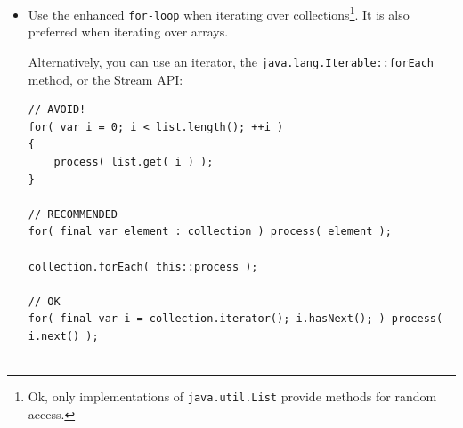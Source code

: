 \documentclass[11pt,a4paper, titlepage, parskip=half, headsepline, footsepline, cleardoublepage=current, headheight=1cm]{scrbook}
\newcommand*{\tqvref}[1]{\hyperref[{#1}]{\ref*{#1}} on page~\pageref{#1}}
\begin{document}
\begin{itemize}
{For method arguments and return values, you should use the interfaces \lstinline|java.util.List|\autocite{ORACLE_DOC_LIST_INTERFACE} instead of \lstinline|Vector|, and \lstinline|java.util.Map|\autocite{ORACLE_DOC_MAP_INTERFACE} instead of \lstinline|Hashtable|. Refer also to chapter \tqvref{sec:TypeOfArgumentsAndReturnValues} that elaborates further on this topic.

If you need an implementation of the \lstinline|List| interface, you should prefer \lstinline|java.util.ArrayList|\autocite{ORACLE_DOC_ARRAYLIST_CLASS} over \lstinline|java.util.LinkedList|\autocite{ORACLE_DOC_LINKEDLIST_CLASS}. The latter is only more performant in some very rare cases, and it also has a bigger memory footprint\footnote{Internally, an \lstinline|ArrayList| uses an array for the entries, and when this gets too small, a new array with twice the size will be allocated. This means that for some time two large array will exist. For really, really large lists, this may cause an issue. In the opposite, a \lstinline|LinkedList| will grow entry by entry.}.

Instead of \lstinline|Hashtable|, you should use \lstinline|java.util.HashMap|\autocite{ORACLE_DOC_HASHMAP_CLASS} as the implementation for the \lstinline|Map| interface.

If you really need a synchronised list, you can still consider to use \lstinline|Vector| as your implementation of \lstinline|List|, but for a syncronised implementation of \lstinline|Map|, you should take \lstinline|java.util.concurrent.ConcurrentHashMap|\autocite{ORACLE_DOC_CONCURRENTHASHMAP_CLASS}.}

\item{Use the enhanced \lstinline|for-loop| when iterating over collections\footnote{Ok, only implementations of \lstinline|java.util.List|\autocite{ORACLE_DOC_LIST_INTERFACE} provide methods for random access.}. It is also preferred when iterating over arrays.

Alternatively, you can use an iterator, the \lstinline|java.lang.Iterable::forEach| method, or the Stream API:
\begin{lstlisting}
// AVOID!
for( var i = 0; i < list.length(); ++i )
{
    process( list.get( i ) );
}

// RECOMMENDED
for( final var element : collection ) process( element );

collection.forEach( this::process );

// OK
for( final var i = collection.iterator(); i.hasNext(); ) process( i.next() );


\end{lstlisting}}
\end{itemize}
\end{document}
